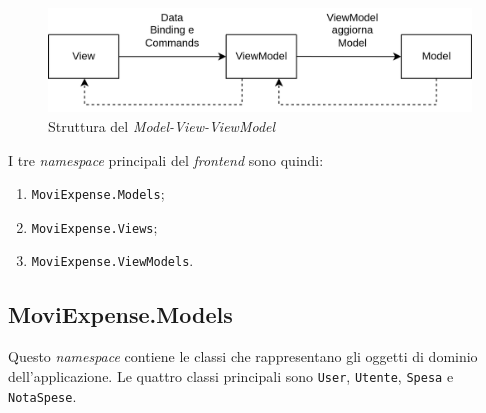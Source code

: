 \begin{figure}[H]
    \centering 
    \includegraphics[width=.9\columnwidth]{images/MVVM.png} 
    \caption{Struttura del \textit{Model-View-ViewModel}}
\end{figure}

\noindent I tre \textit{namespace} principali del \textit{frontend} sono quindi:
\begin{enumerate}
    \item \texttt{MoviExpense.Models};
    \item \texttt{MoviExpense.Views};
    \item \texttt{MoviExpense.ViewModels}.
\end{enumerate}

\subsection{MoviExpense.Models}
\label{cap:model}

Questo \textit{namespace} contiene le classi che rappresentano gli oggetti di dominio dell'applicazione. Le quattro classi principali sono \texttt{User}, \texttt{Utente}, \texttt{Spesa} e \texttt{NotaSpese}.

